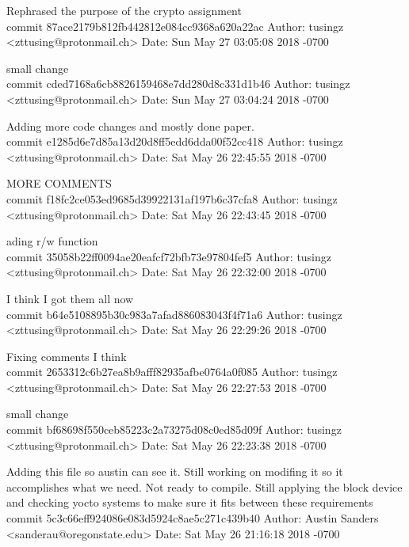 \documentclass[onecolumn, draftclsnofoot,10pt, compsoc]{IEEEtran}
\begin{document}
{    Rephrased the purpose of the crypto assignment\\

commit 87ace2179b812fb442812e084cc9368a620a22ac
Author: tusingz <zttusing@protonmail.ch>
Date:   Sun May 27 03:05:08 2018 -0700

    small change\\

commit cded7168a6cb8826159468e7dd280d8c331d1b46
Author: tusingz <zttusing@protonmail.ch>
Date:   Sun May 27 03:04:24 2018 -0700

    Adding more code changes and mostly done paper.\\

commit e1285d6e7d85a13d20d8ff5edd6dda00f52cc418
Author: tusingz <zttusing@protonmail.ch>
Date:   Sat May 26 22:45:55 2018 -0700

    MORE COMMENTS\\

commit f18fc2ce053ed9685d39922131af197b6c37cfa8
Author: tusingz <zttusing@protonmail.ch>
Date:   Sat May 26 22:43:45 2018 -0700

    ading r/w function\\

commit 35058b22ff0094ae20eafcf72bfb73e97804fef5
Author: tusingz <zttusing@protonmail.ch>
Date:   Sat May 26 22:32:00 2018 -0700

    I think I got them all now\\

commit b64e5108895b30c983a7afad886083043f4f71a6
Author: tusingz <zttusing@protonmail.ch>
Date:   Sat May 26 22:29:26 2018 -0700

    Fixing comments I think\\

commit 2653312c6b27ea8b9afff82935afbe0764a0f085
Author: tusingz <zttusing@protonmail.ch>
Date:   Sat May 26 22:27:53 2018 -0700

    small change\\

commit bf68698f550ceb85223c2a73275d08c0ed85d09f
Author: tusingz <zttusing@protonmail.ch>
Date:   Sat May 26 22:23:38 2018 -0700

    Adding this file so austin can see it. Still working on modifing it so it accomplishes what we need. Not ready to compile. Still applying the block device and checking yocto systems to make sure it fits between these requirements\\

commit 5c3c66eff924086e083d5924c8ae5c271c439b40
Author: Austin Sanders <sanderau@oregonstate.edu>
Date:   Sat May 26 21:16:18 2018 -0700

}
\end{document}
